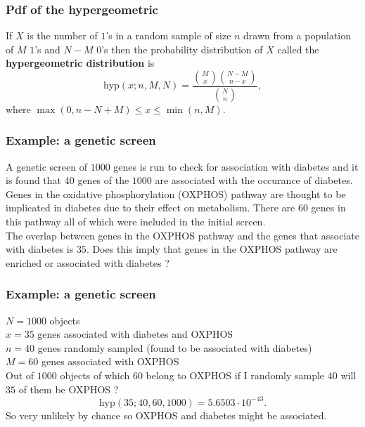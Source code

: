 \begin{frame}[fragile]\frametitle{Pdf of the hypergeometric}

\begin{prop}
If $X$ is the number of $1$'s in a random sample of size $n$ drawn
from a population of $M$ $1$'s and $N-M$ $0$'s then the probability
distribution of $X$ called the {\bf hypergeometric distribution}
is
$$\mbox{hyp}(x;n,M,N) = \frac{\binom{M}{x}
  \binom{N-M}{n-x}}{\binom{N}{n}},$$
where $\max(0,n-N+M) \leq x \leq \min(n,M)$.

\end{prop}

\end{frame}


\begin{frame}[fragile]\frametitle{Example: a genetic screen}

A genetic screen of $1000$ genes is run to check for association
with diabetes and it is found that $40$ genes of the $1000$ are
associated with the occurance of diabetes. \\ 

Genes in the oxidative phosphorylation (OXPHOS) pathway are
thought to be implicated in diabetes due to their effect on
metabolism. There are $60$ genes in this pathway all of which
were included in the initial screen. \\ 


The overlap between genes in the OXPHOS pathway and the genes
that associate with diabetes is $35$. Does this imply that
genes in the OXPHOS pathway are enriched or associated with
diabetes ? 

\end{frame}


\begin{frame}[fragile]\frametitle{Example: a genetic screen}

$N=1000$ objects\\ 
$x=35$ genes associated with diabetes and OXPHOS \\ 
$n=40$ genes randomly sampled (found to be associated with diabetes)
\\ 
$M=60$ genes associated with OXPHOS \\ 

Out of $1000$ objects of which $60$ belong to OXPHOS if I randomly
sample $40$ will $35$ of them be OXPHOS ? \\ 


$$\mbox{hyp}(35;40,60,1000) = 5.6503 \cdot 10^{-43}.$$
So very unlikely by chance so OXPHOS and diabetes might
be associated.

\end{frame}



